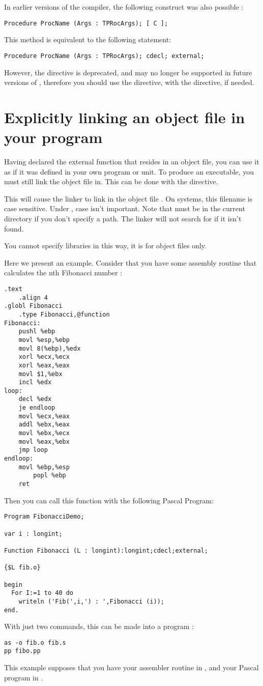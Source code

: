 \documentclass{report}
\begin{document}
In earlier versions of the \fpc compiler, the following construct was
also possible :
\begin{verbatim}
Procedure ProcName (Args : TPRocArgs); [ C ];
\end{verbatim} 
This method is equivalent to the following statement:
\begin{verbatim}
Procedure ProcName (Args : TPRocArgs); cdecl; external;
\end{verbatim} 
However, the \var{[ C ]} directive is deprecated, and may no longer be
supported in future versions of \fpc, therefore you should use the
 directive, with the  directive, if needed.

\section{Explicitly linking an object file in your program}
\label{se:LinkIn}
Having declared the external function that resides in an object file, 
you can use it as if it was defined in your own program or unit. 
To produce an executable, you must still link the object file in. 
This can be done with the  directive.

This will cause the linker to link in the object file . On
\linux systems, this filename is case sensitive. Under \dos, case isn't
important. Note that  must be in the current directory if you
don't specify a path. The linker will not search for  if it
isn't found.

You cannot specify libraries in this way, it is for object files only. 

Here we present an example. Consider that you have some assembly routine that
calculates the nth Fibonacci number :
\begin{verbatim}
.text
	.align 4
.globl Fibonacci
	.type Fibonacci,@function
Fibonacci:
	pushl %ebp
	movl %esp,%ebp
	movl 8(%ebp),%edx
	xorl %ecx,%ecx
	xorl %eax,%eax
	movl $1,%ebx
	incl %edx	
loop:
	decl %edx
	je endloop
	movl %ecx,%eax
	addl %ebx,%eax
	movl %ebx,%ecx
	movl %eax,%ebx
	jmp loop
endloop:
	movl %ebp,%esp
        popl %ebp
	ret
\end{verbatim}
Then you can call this function with the following Pascal Program:
\begin{verbatim}
Program FibonacciDemo;

var i : longint;

Function Fibonacci (L : longint):longint;cdecl;external;

{$L fib.o}

begin
  For I:=1 to 40 do 
    writeln ('Fib(',i,') : ',Fibonacci (i));
end.
\end{verbatim}
With just two commands, this can be made into a program :
\begin{verbatim}
as -o fib.o fib.s
pp fibo.pp
\end{verbatim}
This example supposes that you have your assembler routine in ,
and your Pascal program in .
\end{document}
